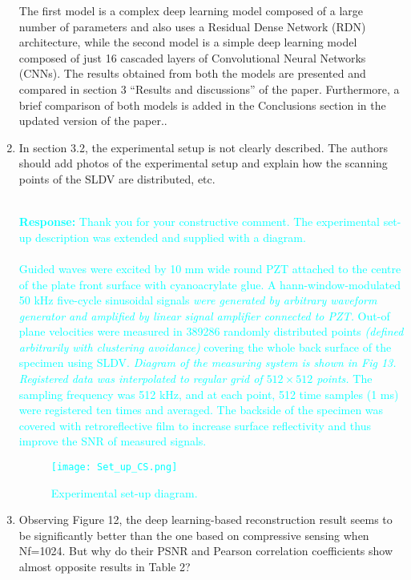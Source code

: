 \documentclass[11pt,a2paper]{report}
\begin{document}
\begin{enumerate}
{			The first model is a complex deep learning model composed of a large number of parameters and also uses a Residual Dense Network (RDN) architecture, while the second model is a simple deep learning model composed of just 16 cascaded layers of Convolutional Neural Networks (CNNs). 
			The results obtained from both the models are presented and compared in section 3 \enquote{Results and discussions} of the paper. 
			Furthermore, a brief comparison of both models is added in the Conclusions section in the updated version of the paper..			
		}
		\item In section 3.2, the experimental setup is not clearly described. 
		The authors should add photos of the experimental setup and explain how the scanning points of the SLDV are distributed, etc.
		\\ \\ 
		\textcolor{Cyan}
		{
			\textbf{Response:}
			Thank you for your constructive comment.
			The experimental set-up description was extended and supplied with a diagram. \\ \\
			Guided waves were excited by 10 mm wide round PZT attached to the centre of the plate front surface with cyanoacrylate glue. 
			A hann-window-modulated 50 kHz five-cycle sinusoidal signals \emph{were generated by arbitrary waveform generator and amplified by linear signal amplifier connected to PZT.} 
			Out-of plane velocities were measured in 389286 randomly distributed points \emph{(defined arbitrarily with clustering avoidance)} covering the whole back surface of the specimen using SLDV. 
			\emph{
				Diagram of the measuring system is shown in Fig 13. 
				Registered data was interpolated to regular grid of \(512\times512\) points.}
			The sampling frequency was 512 kHz, and at each point, 512 time samples (1 ms) were registered ten times and averaged. 
			The backside of the specimen was covered with retroreflective film to increase surface reflectivity and thus improve the SNR of measured signals.
			\setcounter{figure}{12}
			\begin{figure} [!h]
				\centering
				\texttt{[image: Set\_up\_CS.png]}
				\caption{\textcolor{Cyan}{Experimental set-up diagram.}}
				\label{fig:exp_setup}
			\end{figure}
		}
		\item  Observing Figure 12, the deep learning-based reconstruction result seems to be significantly better than the one based on compressive sensing when Nf=1024. 
		But why do their PSNR and Pearson correlation coefficients show almost opposite results in Table 2?

\end{enumerate}
\end{document}
